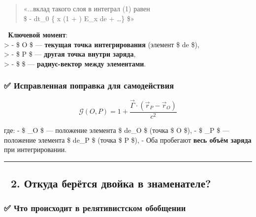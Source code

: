 \documentclass[11pt]{article}
\begin{document}
\begin{quote}
«...вклад такого слоя в интеграл (1) равен\\
\$ - dt\_0 \left\{ \delta x \int \left(1 +
\right) E\_x de +
\dots \right\} \$»
\end{quote}

📌 \textbf{Ключевой момент}:\\
\textgreater{} - \$ O \$ --- \textbf{текущая точка интегрирования}
(элемент \$ de \$),\\
\textgreater{} - \$ P \$ --- \textbf{другая точка внутри заряда},\\
\textgreater{} - \$  \$ ---
\textbf{радиус-вектор между элементами}.

\subsubsection{✅ Исправленная поправка для
самодействия}\label{ux438ux441ux43fux440ux430ux432ux43bux435ux43dux43dux430ux44f-ux43fux43eux43fux440ux430ux432ux43aux430-ux434ux43bux44f-ux441ux430ux43cux43eux434ux435ux439ux441ux442ux432ux438ux44f}

\[
\boxed{
\mathcal{G}(O, P) = 1 + \frac{\vec{\Gamma} \cdot (\vec{r}_P - \vec{r}_O)}{c^2}
}
\]

где: - \$ \_O \$ --- положение элемента \$ de\_O \$ (точка \$ O
\$), - \$ \_P \$ --- положение элемента \$ de\_P \$ (точка \$ P
\$), - Оба пробегают \textbf{весь объём заряда} при интегрировании.

\begin{center}\rule{0.5\linewidth}{\linethickness}\end{center}

\subsection{🔹 2. Откуда берётся двойка в
знаменателе?}\label{ux43eux442ux43aux443ux434ux430-ux431ux435ux440ux451ux442ux441ux44f-ux434ux432ux43eux439ux43aux430-ux432-ux437ux43dux430ux43cux435ux43dux430ux442ux435ux43bux435}

\subsubsection{✅ Что происходит в релятивистском
обобщении}\label{ux447ux442ux43e-ux43fux440ux43eux438ux441ux445ux43eux434ux438ux442-ux432-ux440ux435ux43bux44fux442ux438ux432ux438ux441ux442ux441ux43aux43eux43c-ux43eux431ux43eux431ux449ux435ux43dux438ux438}
\end{document}
